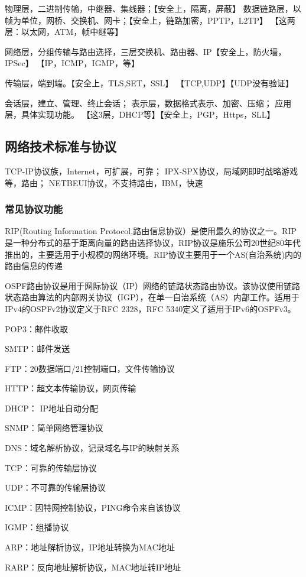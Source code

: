 \documentclass[UTF8]{article}
\begin{document}
物理层，二进制传输，中继器、集线器；【安全上，隔离，屏蔽】
数据链路层，以帧为单位，网桥、交换机、网卡；【安全上，链路加密，PPTP，L2TP】
【这两层：以太网，ATM，帧中继等】

网络层，分组传输与路由选择，三层交换机、路由器、IP【安全上，防火墙，IPSec】
【IP，ICMP，IGMP，等】

传输层，端到端。【安全上，TLS,SET，SSL】
【TCP,UDP】【UDP没有验证】

会话层，建立、管理、终止会话；
表示层，数据格式表示、加密、压缩；
应用层，具体实现功能。
【这3层，DHCP等】【安全上，PGP，Https，SLL】

\subsection{网络技术标准与协议}
TCP-IP协议族，Internet，可扩展，可靠；
IPX-SPX协议，局域网即时战略游戏等，路由；
NETBEUI协议，不支持路由，IBM，快速



\subsubsection{常见协议功能}

RIP(Routing Information Protocol,路由信息协议）是使用最久的协议之一。RIP是一种分布式的基于距离向量的路由选择协议，RIP协议是施乐公司20世纪80年代推出的，主要适用于小规模的网络环境。RIP协议主要用于一个AS(自治系统)内的路由信息的传递

OSPF路由协议是用于网际协议（IP）网络的链路状态路由协议。该协议使用链路状态路由算法的内部网关协议（IGP），在单一自治系统（AS）内部工作。适用于IPv4的OSPFv2协议定义于RFC 2328，RFC 5340定义了适用于IPv6的OSPFv3。

POP3：邮件收取

SMTP：邮件发送

FTP：20数据端口/21控制端口，文件传输协议

HTTP：超文本传输协议，网页传输

DHCP： IP地址自动分配

SNMP：简单网络管理协议

DNS：域名解析协议，记录域名与IP的映射关系

TCP：可靠的传输层协议

UDP：不可靠的传输层协议

ICMP：因特网控制协议，PING命令来自该协议

IGMP：组播协议

ARP：地址解析协议，IP地址转换为MAC地址

RARP：反向地址解析协议，MAC地址转IP地址
\end{document}
